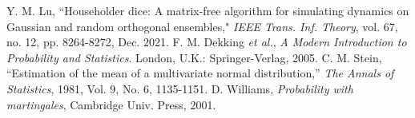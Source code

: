 \documentclass[journal]{IEEEtran}
\begin{document}
\begin{thebibliography}{1}

Y. M. Lu, ``Householder dice: A matrix-free algorithm for simulating dynamics on Gaussian and random orthogonal ensembles," \textit{IEEE Trans.  Inf. Theory}, vol. 67, no. 12, pp. 8264-8272, Dec. 2021. 
F. M. Dekking \textit{et al.}, \textit{A Modern Introduction to Probability and Statistics}. London, U.K.: Springer-Verlag, 2005. 
C. M. Stein, ``Estimation of the mean of a multivariate normal distribution,'' \textit{The Annals of Statistics}, 1981, Vol. 9, No. 6, 1135-1151.
D. Williams, \textit{Probability with martingales}, Cambridge Univ. Press, 2001.

 

 




\end{thebibliography}
\end{document}
